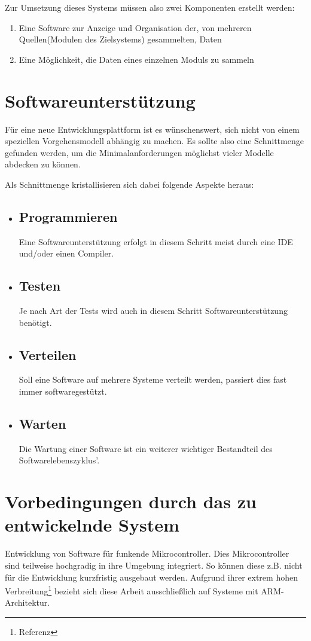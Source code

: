 Zur Umsetzung dieses Systems müssen also zwei Komponenten erstellt werden:
\begin{enumerate}
  \item Eine Software zur Anzeige und Organisation der, von mehreren
  Quellen(Modulen des Zielsystems) gesammelten, Daten
  \item Eine Möglichkeit, die Daten eines einzelnen Moduls zu sammeln
\end{enumerate}

\iffalse
\section{Softwareunterstützung}
Für eine neue Entwicklungsplattform ist es wünschenswert, sich nicht von einem
speziellen Vorgehensmodell abhängig zu machen. Es sollte also eine Schnittmenge
gefunden werden, um die Minimalanforderungen möglichst vieler Modelle abdecken
zu können.

Als Schnittmenge kristallisieren sich dabei folgende Aspekte heraus:
\begin{itemize}
  \item \subsection*{Programmieren} Eine Softwareunterstützung erfolgt in diesem
  Schritt meist durch eine IDE und/oder einen Compiler.
  \item \subsection*{Testen} Je nach Art der Tests wird auch in diesem Schritt
  Softwareunterstützung benötigt. 
  \item \subsection*{Verteilen} Soll eine Software auf mehrere
  Systeme verteilt werden, passiert dies fast immer softwaregestützt.
  \item \subsection*{Warten} Die Wartung einer Software ist ein weiterer
  wichtiger Bestandteil des Softwarelebenszyklus'.
\end{itemize}
\section{Vorbedingungen durch das zu entwickelnde System}\label{sec:vorb}
Entwicklung von Software für funkende Mikrocontroller. Dies Mikrocontroller sind
teilweise hochgradig in ihre Umgebung integriert. So können diese z.B.
nicht für die Entwicklung kurzfristig ausgebaut werden. Aufgrund ihrer extrem
hohen Verbreitung\footnote{Referenz} bezieht sich diese Arbeit ausschließlich
auf Systeme mit ARM-Architektur.
